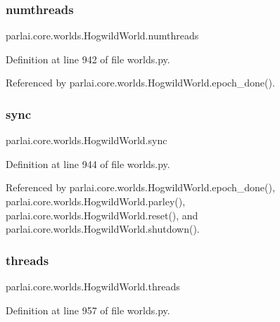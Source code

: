 \subsubsection{\texorpdfstring{numthreads}{numthreads}}
{\footnotesize\ttfamily parlai.\+core.\+worlds.\+Hogwild\+World.\+numthreads}



Definition at line 942 of file worlds.\+py.



Referenced by parlai.\+core.\+worlds.\+Hogwild\+World.\+epoch\+\_\+done().

\mbox{\label{classparlai_1_1core_1_1worlds_1_1HogwildWorld_abe0b40ea70c93221f9f2541cb6089c60}} 
\subsubsection{\texorpdfstring{sync}{sync}}
{\footnotesize\ttfamily parlai.\+core.\+worlds.\+Hogwild\+World.\+sync}



Definition at line 944 of file worlds.\+py.



Referenced by parlai.\+core.\+worlds.\+Hogwild\+World.\+epoch\+\_\+done(), parlai.\+core.\+worlds.\+Hogwild\+World.\+parley(), parlai.\+core.\+worlds.\+Hogwild\+World.\+reset(), and parlai.\+core.\+worlds.\+Hogwild\+World.\+shutdown().

\mbox{\label{classparlai_1_1core_1_1worlds_1_1HogwildWorld_a16d58ef1f8d81bae98e7f99e268ef9b4}} 
\subsubsection{\texorpdfstring{threads}{threads}}
{\footnotesize\ttfamily parlai.\+core.\+worlds.\+Hogwild\+World.\+threads}



Definition at line 957 of file worlds.\+py.



